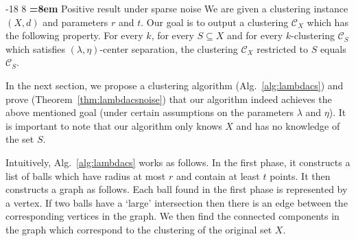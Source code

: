 \documentclass[12pt]{article}
\makeatletter
\newcommand{\mc}{\mathcal}
\renewcommand\subsubsection{\@startsection{subsubsection}{3}{\z@}%
   {-18\p@ \@plus -4\p@ \@minus -4\p@}%
   {8\p@ \@plus 4\p@ \@minus 4\p@}%
   {\normalfont\normalsize\bfseries\boldmath
   \rightskip=\z@ \@plus 8em \pretolerance=10000}}
\makeatother
\begin{document}
\subsubsection{Positive result under sparse noise}
\label{section:lambdaPositiveResultSparseNoise}
We are given a clustering instance $(X, d)$ and parameters $r$ and $t$. Our goal is to output a clustering $\mc C_{X}$ which has the following property. For every $k$, for every $S \subseteq X$ and for every $k$-clustering $\mc C_{S}$ which satisfies $(\lambda, \eta)$-center separation, the clustering $\mc C_{X}$ restricted to $S$ equals $\mc C_{S}$. 

In the next section, we propose a clustering algorithm (Alg.~\ref{alg:lambdacs}) and prove (Theorem~\ref{thm:lambdacsnoise}) that our algorithm indeed achieves the above mentioned goal (under certain assumptions on the parameters $\lambda$ and $\eta$). It is important to note that our algorithm only knows $X$ and has no knowledge of the set $S$. 

Intuitively, Alg.~\ref{alg:lambdacs} works as follows. In the first phase, it constructs a list of balls which have radius at most $r$ and contain at least $t$ points. It then constructs a graph as follows. Each ball found in the first phase is represented by a vertex. If two balls have a `large' intersection then there is an edge between the corresponding vertices in the graph. We then find the connected components in the graph which correspond to the clustering of the original set $X$. 
\end{document}

